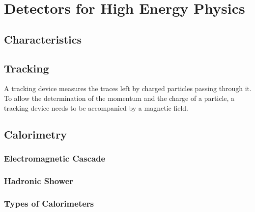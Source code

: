 \section{Detectors for High Energy Physics}
\label{sec:detectors}

\subsection{Characteristics}

\subsection{Tracking}
A tracking device measures the traces left by charged particles passing through it. To allow the determination of the momentum and the charge of a particle, a tracking device needs to be accompanied by a magnetic field. 

\subsection{Calorimetry}

\subsubsection{Electromagnetic Cascade}

\subsubsection{Hadronic Shower}

\subsubsection{Types of Calorimeters}